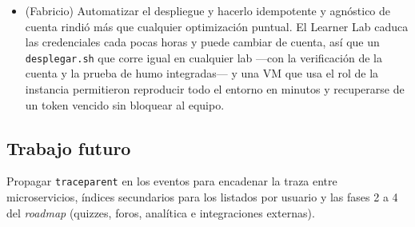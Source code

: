 \begin{itemize}
        eventos y los OpenAPI de \texttt{nubeduca-contratos} cerrados al inicio, cada microservicio
        se construyó contra esquemas validados en CI, sin esperar a los demás. Pero en DynamoDB los
        patrones de acceso se diseñan junto con el contrato, no después: \texttt{GET /courses} del
        docente quedó como una \texttt{query} de toda la partición del tenant con filtro por
        \texttt{ownerId}, y solo la prueba de carga mostró que con 15\,000 cursos tarda 1{,}7\,s. Cada
        consulta frecuente necesita su clave o su índice desde el diseño de la tabla.
  \item (Fabricio) Automatizar el despliegue y hacerlo idempotente y agnóstico de cuenta rindió más que
        cualquier optimización puntual. El Learner Lab caduca las credenciales cada pocas horas y puede
        cambiar de cuenta, así que un \texttt{desplegar.sh} que corre igual en cualquier lab —con la
        verificación de la cuenta y la prueba de humo integradas— y una VM que usa el rol de la instancia
        permitieron reproducir todo el entorno en minutos y recuperarse de un token vencido sin bloquear
        al equipo.
\end{itemize}

\subsection{Trabajo futuro}
Propagar \texttt{traceparent} en los eventos para encadenar la traza entre microservicios, índices
secundarios para los listados por usuario y las fases 2 a 4 del \textit{roadmap} (quizzes, foros,
analítica e integraciones externas).
